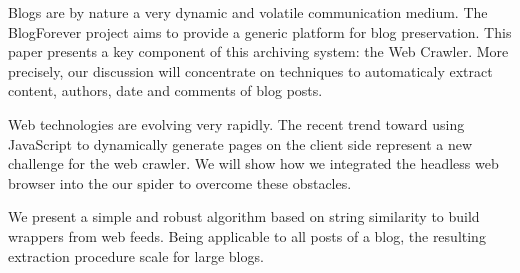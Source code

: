 Blogs are by nature a very dynamic and volatile communication medium. The
BlogForever project aims to provide a generic platform for blog preservation.
This paper presents a key component of this archiving system: the Web Crawler.
More precisely, our discussion will concentrate on techniques to automaticaly
extract content, authors, date and comments of blog posts.

Web technologies are evolving very rapidly. The recent trend toward using
JavaScript to dynamically generate pages on the client side represent a new
challenge for the web crawler. We will show how we integrated the headless web
browser into the our spider to overcome these obstacles.

We present a simple and robust algorithm based on string similarity to build
wrappers from web feeds. Being applicable to all posts of a blog, the
resulting extraction procedure scale for large blogs.
